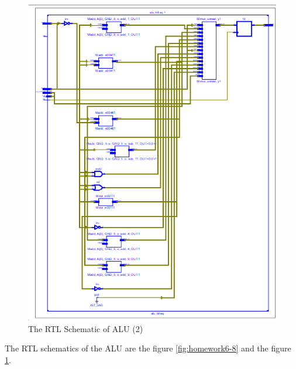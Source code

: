 \documentclass{article}
\begin{document}
    \begin{figure}
      \centering
      \includegraphics[width=1\linewidth]{homework6-7}
      \caption{The RTL Schematic of ALU (2)}
      \label{fig:homework6-7}
    \end{figure}
    

    The RTL schematics of the ALU are the figure \ref{fig:homework6-8} and the figure \ref{fig:homework6-7}.
    
\end{document}

